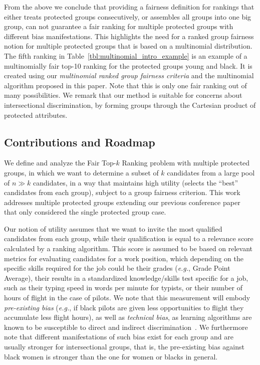 From the above we conclude that providing a fairness definition for rankings that either treats protected groups consecutively, or assembles all groups into one big group, can not guarantee a fair ranking for multiple protected groups with different bias manifestations.
%
This highlights the need for a ranked group fairness notion for multiple protected groups that is based on a multinomial distribution.
%
The fifth ranking in Table~\ref{tbl:multinomial_intro_example} is an example of a multinomially fair top-10 ranking for the protected groups young and black.
%
It is created using our \textit{multinomial ranked group fairness criteria} and the multinomial \algoFAIR algorithm proposed in this paper.
%
Note that this is only one fair ranking out of many possibilities.
%
We remark that our method is suitable for concerns about intersectional discrimination, by forming groups through the Cartesian product of protected attributes.

\subsection{Contributions and Roadmap}
We define and analyze the {\sc Fair Top-$k$ Ranking problem} with multiple protected groups, in which we want to determine a subset of $k$ candidates from a large pool of $n \gg k$ candidates, in a way that maintains high utility (selects the ``best'' candidates from each group), subject to a group fairness criterion.
%
This work addresses multiple protected groups extending our previous conference paper~\cite{zehlike2017fair} that only considered the single protected group case.
%
%

Our notion of utility assumes that we want to invite the most qualified candidates from each group, while their qualification is equal to a relevance score calculated by a ranking algorithm.
%
This score is assumed to be based on relevant metrics for evaluating candidates for a work position, which depending on the specific skills required for the job could be their grades ({\em e.g.}, Grade Point Average), their results in a standardized knowledge/skills test specific for a job, such as their typing speed in words per minute for typists, or their number of hours of flight in the case of pilots.
%
We note that this measurement will embody \emph{pre-existing bias} ({\em e.g.}, if black pilots are given less opportunities to flight they accumulate less flight hours), as well as \emph{technical bias}, as learning algorithms are known to be susceptible to direct and indirect discrimination~\cite{tuto2016,HajianFerrer12}.
%
We furthermore note that different manifestations of such bias exist for each group and are usually stronger for intersectional groups, that is, the pre-existing bias against black women is stronger than the one for women or blacks in general.
%

